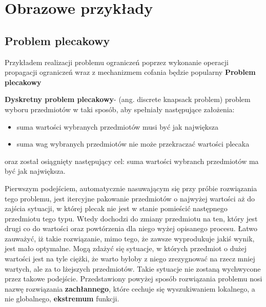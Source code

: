 \section{Obrazowe przykłady}
    \subsection{Problem plecakowy}
    Przykładem realizacji problemu ograniczeń poprzez wykonanie operacji propagacji ograniczeń wraz z mechanizmem cofania będzie popularny \textbf{Problem plecakowy}
    \begin{example}
        \textbf{Dyskretny problem plecakowy}- (ang. discrete knapsack problem) problem wyboru przedmiotów w taki sposób, aby spełniały następujące założenia:
        \begin{itemize}
            \item suma wartości wybranych przedmiotów musi być jak największa 
            \item suma wag wybranych przedmiotów nie może przekraczać wartości plecaka
        \end{itemize}
        oraz został osiągnięty następujący cel: suma wartości wybranch przedmiotów ma być jak największa.
    \end{example}

    Pierwszym podejściem, automatycznie nasuwającym się przy próbie rozwiązania tego problemu, 
    jest itercyjne pakowanie przedmiotów o najwyżej wartości aż do zajścia
    sytuacji, w której plecak nie jest w stanie pomieścić następnego przedmiotu tego typu. Wtedy dochodzi do zmiany przedmiotu na ten, który jest 
    drugi co do wartości oraz powtórzenia dla niego wyżej opisanego procesu. Łatwo zauważyć, iż takie rozwiązanie, mimo tego, że zawsze wyprodukuje 
    jakiś wynik, jest mało optymalne. Mogą zdażyć się sytuacje, w których przedmiot o dużej wartości jest na tyle ciężki, że warto byłoby z niego 
    zrezygnować na rzecz mniej wartych, ale za to lżejszych przedmiotów. Takie sytuacje nie zostaną wychwycone przez takowe podejście. 
    Przedstawiony powyżej sposób rozwiązania problemu nosi nazwę rozwiązania \textbf{zachłannego}, które cechuje się wyszukiwaniem lokalnego, a
    nie globalnego, \textbf{ekstremum} funkcji.

